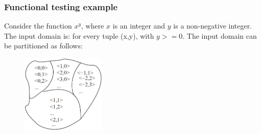 \begin{frame}[hasprev=false,hasnext=false]
\label{example:functional-testing}
\frametitle{Functional testing example}

Consider the function $x^y$, where $x$ is an integer and $y$ is a non-negative
integer. The input domain is: for every tuple (x,y), with $y >= 0$. The input
domain can be partitioned as follows:

\begin{figure}
    \centering
    \includegraphics[width=4cm]{aux/examples/functional-testing/functional-testing}
\end{figure}
\end{frame}

